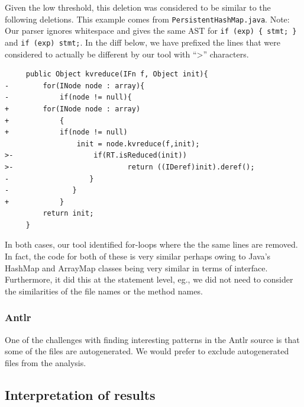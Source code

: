Given the low threshold, this deletion was considered to be similar to the
following deletions. This example comes from {\tt PersistentHashMap.java}.
Note: Our parser ignores whitespace and gives the same AST for \verb|if (exp) { stmt; }|
and \verb|if (exp) stmt;|. In the diff below, we have prefixed the
lines that were considered to actually be different by our tool with ``>''
characters.

\begin{verbatim}
     public Object kvreduce(IFn f, Object init){
-        for(INode node : array){
-            if(node != null){
+        for(INode node : array)
+            {
+            if(node != null)
                 init = node.kvreduce(f,init);
>-                   if(RT.isReduced(init))
>-                           return ((IDeref)init).deref();
-                   }
-               }
+            }
         return init;
     }
\end{verbatim}

In both cases, our tool identified for-loops where the the same lines are
removed. In fact, the code for both of these is very similar perhaps owing to
Java's HashMap and ArrayMap classes being very similar in terms of interface.
Furthermore, it did this at the statement level, eg., we did not need to
consider the similarities of the file names or the method names.


\subsubsection{Antlr}

One of the challenges with finding interesting patterns in the Antlr source is
that some of the files are autogenerated. We would prefer to exclude
autogenerated files from the analysis.

\subsection{Interpretation of results}


